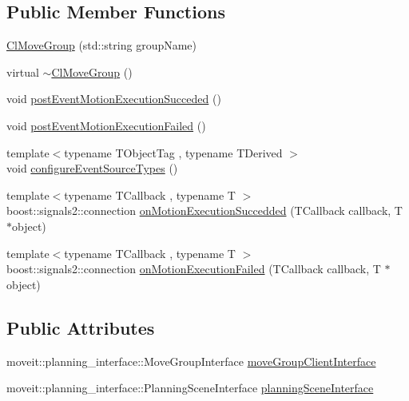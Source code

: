 \subsection*{Public Member Functions}
\begin{DoxyCompactItemize}
\item 
\hyperlink{classsm__moveit_1_1cl__movegroup_1_1ClMoveGroup_a996b92fda56d04827995d6a012430f36}{Cl\+Move\+Group} (std\+::string group\+Name)
\item 
virtual \hyperlink{classsm__moveit_1_1cl__movegroup_1_1ClMoveGroup_a4b467d3ba8ede975c2de956037932c82}{$\sim$\+Cl\+Move\+Group} ()
\item 
void \hyperlink{classsm__moveit_1_1cl__movegroup_1_1ClMoveGroup_ab4585dcd850286ed168a25a3ddd56eed}{post\+Event\+Motion\+Execution\+Succeded} ()
\item 
void \hyperlink{classsm__moveit_1_1cl__movegroup_1_1ClMoveGroup_a8d0530e2ad4e2ce2dc9a59ccea9ce69a}{post\+Event\+Motion\+Execution\+Failed} ()
\item 
{\footnotesize template$<$typename T\+Object\+Tag , typename T\+Derived $>$ }\\void \hyperlink{classsm__moveit_1_1cl__movegroup_1_1ClMoveGroup_a5e90b33e031149241eaa4159304f3009}{configure\+Event\+Source\+Types} ()
\item 
{\footnotesize template$<$typename T\+Callback , typename T $>$ }\\boost\+::signals2\+::connection \hyperlink{classsm__moveit_1_1cl__movegroup_1_1ClMoveGroup_a5359b864e258cb51d0d7ff7ffc615b58}{on\+Motion\+Execution\+Succedded} (T\+Callback callback, T $\ast$object)
\item 
{\footnotesize template$<$typename T\+Callback , typename T $>$ }\\boost\+::signals2\+::connection \hyperlink{classsm__moveit_1_1cl__movegroup_1_1ClMoveGroup_a6c869d27e767840b9ac437d838394c79}{on\+Motion\+Execution\+Failed} (T\+Callback callback, T $\ast$object)
\end{DoxyCompactItemize}
\subsection*{Public Attributes}
\begin{DoxyCompactItemize}
\item 
moveit\+::planning\+\_\+interface\+::\+Move\+Group\+Interface \hyperlink{classsm__moveit_1_1cl__movegroup_1_1ClMoveGroup_a23acf6883455566dbab30e4367c2144d}{move\+Group\+Client\+Interface}
\item 
moveit\+::planning\+\_\+interface\+::\+Planning\+Scene\+Interface \hyperlink{classsm__moveit_1_1cl__movegroup_1_1ClMoveGroup_a26b5c9e0aef1cd67ee977a756b69cf76}{planning\+Scene\+Interface}
\end{DoxyCompactItemize}
